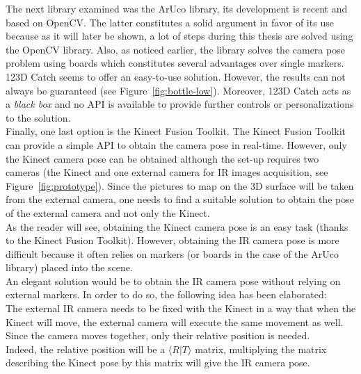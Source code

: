 The next library examined was the ArUco library, its development is recent and based on OpenCV. The latter constitutes a solid argument in favor of its use because as it will later be shown, a lot of steps during this thesis are solved using the OpenCV library. Also, as noticed earlier, the library solves the camera pose problem using boards which constitutes several advantages over single markers.\\

123D Catch seems to offer an easy-to-use solution. However, the results can not always be guaranteed (see Figure~\ref{fig:bottle-low}). Moreover, 123D Catch acts as a \textit{black box} and no API is available to provide further controls or personalizations to the solution.\\

Finally, one last option is the Kinect Fusion Toolkit. The Kinect Fusion Toolkit can provide a simple API to obtain the camera pose in real-time. However, only the Kinect camera pose can be obtained although the set-up requires two cameras (the Kinect and one external camera for IR images acquisition, see Figure~\ref{fig:prototype}). Since the pictures to map on the 3D surface will be taken from the external camera, one needs to find a suitable solution to obtain the pose of the external camera and not only the Kinect.\\

As the reader will see, obtaining the Kinect camera pose is an easy task (thanks to the Kinect Fusion Toolkit). However, obtaining the IR camera pose is more difficult because it often relies on markers (or boards in the case of the ArUco library) placed into the scene. \\

An elegant solution would be to obtain the IR camera pose without relying on external markers. In order to do so, the following idea has been elaborated:\\

The external IR camera needs to be fixed with the Kinect in a way that when the Kinect will move, the external camera will execute the same movement as well. Since the camera moves together, only their relative position is needed.\\ 

Indeed, the relative position will be a $\langle R\vert T\rangle$ matrix, multiplying the matrix describing the Kinect pose by this matrix will give the IR camera pose.\\

